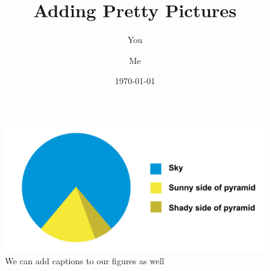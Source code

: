 \documentclass[a4paper]{article}
\begin{document}
\title{Adding Pretty Pictures }
\author{You \and Me}
\date{\today}
\maketitle

\begin{figure}[h]
\begin{center}
\includegraphics[scale=0.5]{figure_example.png}
\end{center}
\caption{We can add captions to our figures as well}
\end{figure}
\end{document}
